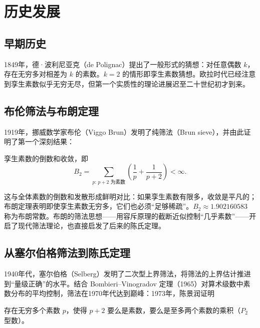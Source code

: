 \section{历史发展}\label{sec:history}

\subsection{早期历史}

1849年，德·波利尼亚克（de Polignac）提出了一般形式的猜想\cite{depolignac1849}：对任意偶数 $k$，存在无穷多对相差为 $k$ 的素数。$k=2$ 的情形即孪生素数猜想。欧拉时代已经注意到孪生素数似乎无穷无尽，但第一个实质性的理论进展迟至二十世纪初才到来。

\subsection{布伦筛法与布朗定理}

1919年，挪威数学家布伦（Viggo Brun）发明了纯筛法（Brun sieve），并由此证明了第一个深刻结果\cite{brun1919}：

\begin{theorem}[布朗定理]
    孪生素数的倒数和收敛，即
    \begin{equation}
        B_2 = \sum_{p:\, p+2 \text{ 为素数}} \left(\frac{1}{p} + \frac{1}{p+2}\right) < \infty.
    \end{equation}
\end{theorem}

这与全体素数的倒数和发散形成鲜明对比：如果孪生素数有限多，收敛是平凡的；布朗定理表明即使孪生素数无穷多，它们也必须“足够稀疏”。$B_2 \approx 1.902160583$ 称为布朗常数。布朗的筛法思想——用容斥原理的截断近似控制“几乎素数”——开启了现代筛法理论，也直接启发了后来的陈氏定理。

\subsection{从塞尔伯格筛法到陈氏定理}

1940年代，塞尔伯格（Selberg）发明了二次型上界筛法，将筛法的上界估计推进到“量级正确”的水平。结合 Bombieri--Vinogradov 定理（1965）对算术级数中素数分布的平均控制\cite{bombieri1965largesieve}，筛法在1970年代达到巅峰：1973年，陈景润证明\cite{chen1973twin}

\begin{theorem}
    存在无穷多个素数 $p$，使得 $p+2$ 要么是素数，要么是至多两个素数的乘积（$P_2$ 型数）。
\end{theorem}

